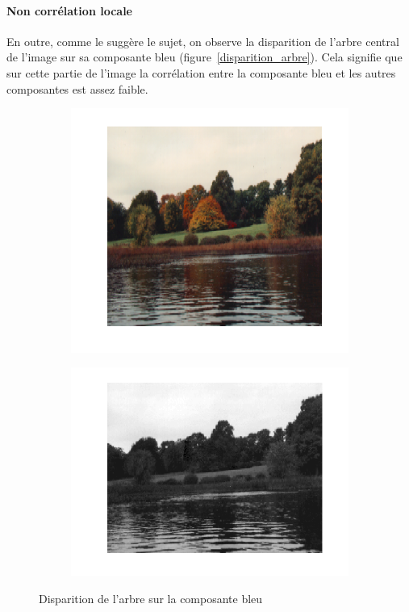 \documentclass{article}
\begin{document}
\paragraph{Non corrélation locale}
En outre, comme le suggère le sujet, on observe la disparition de l'arbre central de l'image sur sa composante bleu (figure~\ref{disparition_arbre}). Cela signifie que sur cette partie de l'image la corrélation entre la composante bleu et les autres composantes est assez faible.
\begin{figure}[ht]
    \centering
    \begin{subfigure}[c]{0.45\linewidth}
    	\centering
    	\includegraphics[width=\linewidth]{images/1/1-1-autumn_rgb.png}
    \end{subfigure}
    \hfill
    \begin{subfigure}[c]{0.45\linewidth}
    	\centering
    	\includegraphics[width=\linewidth]{images/1/1-1-autumn_b.png}
    \end{subfigure}
    \caption{Disparition de l'arbre sur la composante bleu}
    \label{disparition_arbre}
    \label{truc}
\end{figure}
\end{document}
